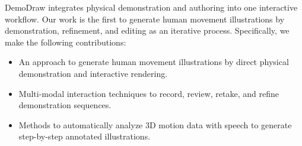 DemoDraw integrates physical demonstration and authoring into one interactive workflow. Our work is the first to generate human movement illustrations by demonstration, refinement, and editing as an iterative process. Specifically, we make the following contributions:
\begin{itemize}
  \item An approach to generate human movement illustrations by direct physical demonstration and interactive rendering.
  \item Multi-modal interaction techniques to record, review, retake, and refine demonstration sequences.
  \item Methods to automatically analyze 3D motion data with speech to generate step-by-step annotated illustrations.
\end{itemize}

